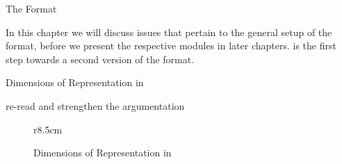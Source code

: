 
\begin{omgroup}[creators=miko,id=spec-intro]{The \omdoc Format}

In this chapter we will discuss issues that pertain to the general setup of the \omdoc
format, before we present the respective modules in later chapters. {} is the
first step towards a second version of the \omdoc format.


\begin{omgroup}[id=syntax-semantics]{Dimensions of Representation in \omdoc}
\begin{newpart}{re-read and strengthen the argumentation}
\begin{figure}r{8.5cm}\vspace*{-1em}
\caption{Dimensions of Representation in \omdoc}\label{fig:dimensions}\vspace*{-1em}
\end{figure}

\end{newpart}
\end{omgroup}
\end{omgroup}
